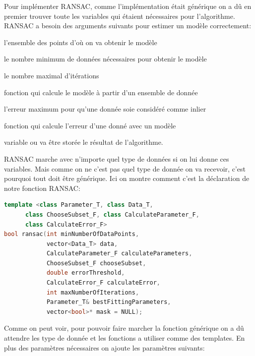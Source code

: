 \documentclass[11pt]{article}
\begin{document}
Pour implémenter RANSAC, comme l'implémentation était générique on a dû en premier trouver toute les variables qui étaient nécessaires pour l’algorithme. \\
RANSAC a besoin des arguments suivants pour estimer un modèle correctement:
\begin{description}[labelindent=16pt,style=multiline,leftmargin=7cm, noitemsep]
	\item[data:] l’ensemble des points d’où on va obtenir le modèle
	\item[minNumberOfDataPoints:] le nombre minimum de données nécessaires pour obtenir le modèle
	\item[maxNumberOfIterations:] le nombre maximal d’itérations
	\item[calculateParameters:] fonction qui calcule le modèle à partir d’un ensemble de donnée
	\item[errorThreshold:] l’erreur maximum pour qu’une donnée soie considéré comme inlier
	\item[calculateError:] fonction qui calcule l’erreur d’une donné avec un modèle
	\item[bestFittingParameters:] variable ou va être storée le résultat de l'algorithme.
\end{description}

\pagebreak

RANSAC marche avec n’importe quel type de données si on lui donne ces variables. Mais comme on ne c’est pas quel type de donnée on va recevoir, c’est pourquoi tout doit être générique. Ici on montre comment c’est la déclaration de notre fonction RANSAC:

\begin{lstlisting}[language=c++]
template <class Parameter_T, class Data_T, 
	  class ChooseSubset_F, class CalculateParameter_F,
	  class CalculateError_F>
bool ransac(int minNumberOfDataPoints,
            vector<Data_T> data,
            CalculateParameter_F calculateParameters, 
            ChooseSubset_F chooseSubset,
            double errorThreshold, 
            CalculateError_F calculateError, 
            int maxNumberOfIterations,
            Parameter_T& bestFittingParameters,
            vector<bool>* mask = NULL);
\end{lstlisting}

Comme on peut voir, pour pouvoir faire marcher la fonction générique on a dû attendre les type de donnée et les fonctions a utiliser comme des templates. En plus des paramètres nécessaires on ajoute les paramètres suivants:
\end{document}
